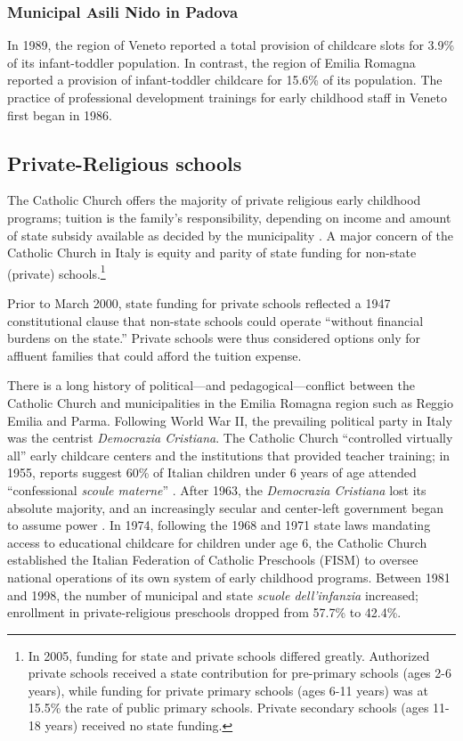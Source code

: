 \documentclass[11pt]{article}
\begin{document}
\subsubsection{Municipal Asili Nido in Padova}
In 1989, the region of Veneto reported a total provision of childcare slots for 3.9\% of its infant-toddler population. In contrast, the region of Emilia Romagna reported a provision of infant-toddler childcare for 15.6\% of its population. The practice of professional development trainings for early childhood staff in Veneto first began in 1986. 

\subsection{Private-Religious schools}
The Catholic Church offers the majority of private religious early childhood programs; tuition is the family's responsibility, depending on income and amount of state subsidy available as decided by the municipality \citep{Hohnerlein_2009_Paradox-Public-Preschools}.  A major concern of the Catholic Church in Italy is equity and parity of state funding for non-state (private) schools.\footnote{In 2005, funding for state and private schools differed greatly. Authorized private schools received a state contribution for pre-primary schools (ages 2-6 years), while funding for private primary schools (ages 6-11 years) was at 15.5\% the rate of public primary schools. Private secondary schools (ages 11-18 years) received no state funding.}

Prior to March 2000, state funding for private schools reflected a 1947 constitutional clause that non-state schools could operate ``without financial burdens on the state.'' Private schools were thus considered options only for affluent families that could afford the tuition expense. 

There is a long history of political---and pedagogical---conflict between the Catholic Church and municipalities in the Emilia Romagna region such as Reggio Emilia and Parma. Following World War II, the prevailing political party in Italy was the centrist \textit{Democrazia Cristiana}. The Catholic Church ``controlled virtually all'' early childcare centers and the institutions that provided teacher training; in 1955, reports suggest 60\% of Italian children under 6 years of age attended ``confessional \textit{scoule materne}'' \citep{Hohnerlein_2015_Development-and-Diffusion}. After 1963, the \textit{Democrazia Cristiana} lost its absolute majority, and an increasingly secular and center-left government began to assume power \citep{Hohnerlein_2009_Paradox-Public-Preschools}. In 1974, following the 1968 and 1971 state laws mandating access to educational childcare for children under age 6, the Catholic Church established the Italian Federation of Catholic Preschools (FISM) to oversee national operations of its own system of early childhood programs. Between 1981 and 1998, the number of municipal and state \textit{scuole dell'infanzia} increased; enrollment in private-religious preschools dropped from 57.7\% to 42.4\%.
 
\end{document}
